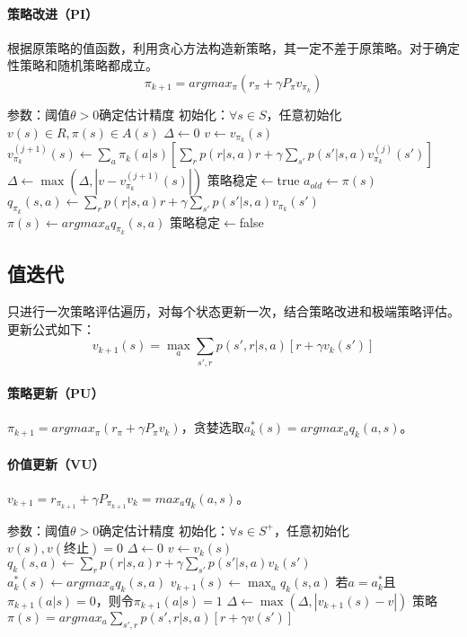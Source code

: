 \documentclass[
12pt, %
a4paper, 
oneside, %
headinclude,footinclude, %
]{scrartcl}
\begin{document}
\paragraph{策略改进（PI）}
根据原策略的值函数，利用贪心方法构造新策略，其一定不差于原策略。对于确定性策略和随机策略都成立。
$$ \pi_{k + 1} = argmax_{\pi}(r_{\pi} + \gamma P_{\pi}v_{\pi_k}) $$
\begin{myalgorithm}[策略迭代]
\State 参数：阈值$ \theta > 0 $确定估计精度
\State 初始化：$ \forall s \in S $，任意初始化$ v(s) \in R, \pi(s) \in A(s) $
\Repeat
\Repeat {}
\State $ \Delta \gets 0 $
\State $ v \gets v_{\pi_k}(s) $
\State $ v_{\pi_k}^{(j + 1)}(s) \gets \sum_a \pi_k(a|s)[\sum_r p(r|s,a)r + \gamma \sum_{s'}p(s'|s,a)v_{\pi_k}^{(j)}(s')] $
\State $ \Delta \gets \max(\Delta, |v - v_{\pi_k}^{(j+1)}(s)|) $
\EndFor
\Until{$ \Delta < \theta $}
\State 策略稳定$ \gets $true 
\State $ a_{old} \gets \pi(s) $
\State $ q_{\pi_k}(s,a) \gets \sum_r p(r|s,a)r + \gamma \sum_{s'} p(s'|s,a)v_{\pi_k}(s') $
\EndFor
\State $ \pi(s) \gets argmax_a q_{\pi_k}(s,a) $
\State 策略稳定$ \gets $false
\EndIf
\EndFor
{}
\end{myalgorithm}
\subsection[值迭代]{值迭代}
只进行一次策略评估遍历，对每个状态更新一次，结合策略改进和极端策略评估。
更新公式如下：
$$ v_{k + 1}(s) = \max_a \sum_{s', r} p(s', r|s, a)[r + \gamma v_k(s')] $$
\paragraph{策略更新（PU）}
$ \pi_{k + 1} = argmax_{\pi}(r_{\pi} + \gamma P_{\pi}v_k) $，贪婪选取$ a^*_k(s) = argmax_a q_k(a, s) $。
\paragraph{价值更新（VU）}
$ v_{k + 1} = r_{\pi_{k + 1}} + \gamma P_{\pi_{k + 1}}v_k = max_a q_k(a, s) $。
\begin{myalgorithm}[值迭代]
\State 参数：阈值$ \theta > 0 $确定估计精度
\State 初始化：$ \forall s \in S^+ $，任意初始化$ v(s), v(\text{终止}) = 0 $
\Repeat
\State $ \Delta \gets 0 $
\State $ v \gets v_k(s) $
\State $ q_k(s, a) \gets \sum_r p(r|s, a)r + \gamma \sum_{s'} p(s'|s, a)v_k(s') $
\EndFor
\State $ a^*_k(s) \gets argmax_a q_k(s, a) $
\State $ v_{k + 1}(s) \gets \max_a q_k(s, a) $
\State 若$ a = a^*_k $且$ \pi_{k + 1}(a|s) = 0 $，则令$ \pi_{k + 1}(a|s) = 1 $
\State $ \Delta \gets \max(\Delta, |v_{k+1}(s) - v|) $
\EndFor
\Until{$ \Delta < \theta $}
\State \Return 策略 $ \pi(s) = argmax_a \sum_{s',r}p(s',r|s,a)[r + \gamma v(s')] $
\end{myalgorithm}
\end{document}
